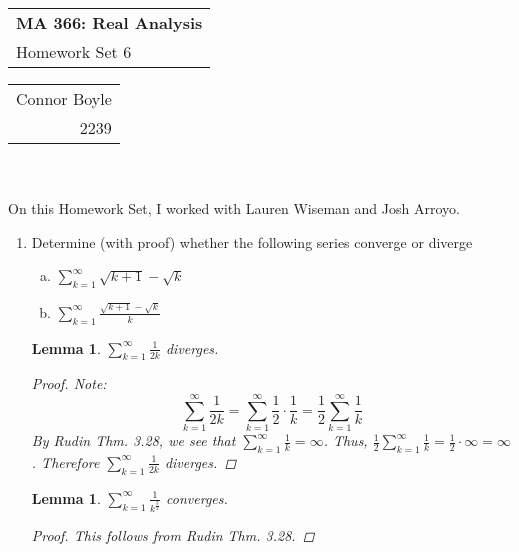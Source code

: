 \documentclass{amsart}
\def\name{Connor Boyle} %
\def\CM{2239} %
\def\hwnum{6} %
\newtheorem{lemma}[theorem]{Lemma}
\begin{document}
\noindent
\thispagestyle{firststyle}
\begin{tabular}{l}
{\LARGE \textbf{MA 366: Real Analysis} }\\
{\Large Homework Set \hwnum}
\end{tabular} \hfill \begin{tabular}{r}
                        \name \\
                        \CM
                        \end{tabular}

\noindent \hrulefill \\\\
On this Homework Set, I worked with Lauren Wiseman and Josh Arroyo.\\
\begin{enumerate}[1.]
\item Determine (with proof) whether the following series converge or diverge
\begin{enumerate}[(a)]
\item $\displaystyle \sum_{k=1}^\infty \sqrt{k+1}-\sqrt{k}$
\item $\displaystyle \sum_{k=1}^\infty \frac{\sqrt{k+1}-\sqrt{k}}{k}$
\end{enumerate}
\begin{lemma}
    $\displaystyle \sum_{k=1}^\infty \frac{1}{2k}$ diverges.
    \begin{proof}
        Note:
        \[
            \sum_{k = 1}^\infty \frac{1}{2k} = \sum_{k = 1}^\infty \frac{1}{2} \cdot \frac{1}{k} = \frac{1}{2} \sum_{k = 1}^\infty \frac{1}{k}   
        \]
        By Rudin Thm. 3.28, we see that $\displaystyle \sum_{k = 1}^\infty \frac{1}{k} = \infty$. Thus,
        $\displaystyle \frac{1}{2} \sum_{k = 1}^\infty \frac{1}{k} = \frac{1}{2} \cdot \infty = \infty$.
        Therefore $\displaystyle \sum_{k=1}^\infty \frac{1}{2k}$ diverges.
    \end{proof}
\end{lemma}
\begin{lemma}
    $\displaystyle \sum_{k=1}^\infty \frac{1}{k^{\frac{3}{2}}}$ converges.
    \begin{proof}
        This follows from Rudin Thm. 3.28.
    \end{proof}
\end{lemma}


\end{enumerate}
\end{document}
